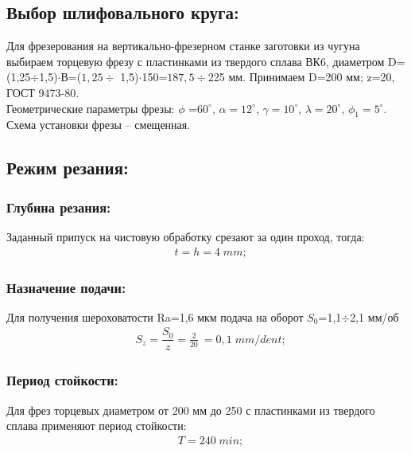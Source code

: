\subsection{Выбор шлифовального круга:}
Для фрезерования на вертикально-фрезерном станке заготовки из чугуна выбираем торцевую фрезу с пластинками из твердого сплава ВК6, диаметром D=(1,25$\div$1,5)$\cdot$В=($1,25\div$ 1,5)$\cdot$150=$187,5\div$225 мм. Принимаем D=200 мм; z=20, ГОСТ 9473-80.\\
   Геометрические параметры фрезы: $\phi$ =$60^{\circ}$, $\alpha=12^{\circ}$, $\gamma=10^{\circ}$, $\lambda=20^{\circ}$, $\phi_1=5^{\circ}$.\\
Схема установки фрезы – смещенная.

\subsection{Режим резания:}
\subsubsection{Глубина резания:}
Заданный припуск на чистовую обработку срезают за один проход, тогда:\\
\begin{equation}
	\begin{split}
		&t=h=4\;mm;
	\end{split}
\end{equation}

\subsubsection{Назначение подачи:}
Для получения шероховатости Ra=1,6 мкм подача на оборот $S_0$=1,1$\div$2,1 мм/об\\
\begin{equation}
	\begin{split}
		&S_z=\dfrac{S_0}{z} = \frac{2}{20}\ = 0,1\;mm/dent;
	\end{split}
\end{equation}

\subsubsection{Период стойкости:}
Для фрез торцевых диаметром от 200 мм до 250 с пластинками из твердого сплава применяют период стойкости:\\
\begin{equation}
	\begin{split}
		&T=240\;min;
	\end{split}
\end{equation}

